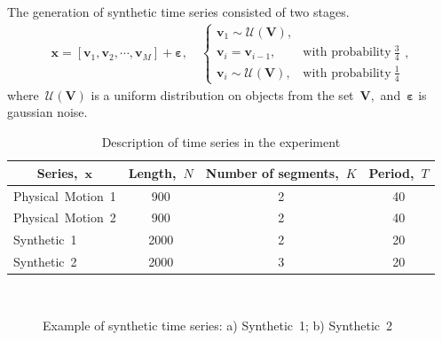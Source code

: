 \documentclass[12pt, twoside]{article}
\numberwithin{equation}{section}
\begin{document}
The generation of synthetic time series consisted of two stages.
\begin{equation}
\label{eq:exp:1}
\begin{aligned}
\textbf{x} = [\textbf{v}_{1}, \textbf{v}_{2}, \cdots, \textbf{v}_{M}] + \bm{\varepsilon}, \quad \begin{cases}
    \textbf{v}_{1} \sim \mathcal{U}\left(\mathbf{V}\right),\\
    \textbf{v}_{i} = \textbf{v}_{i - 1}, & \text{with probability}~\frac{3}{4}\\
    \textbf{v}_{i} \sim \mathcal{U}\left(\mathbf{V}\right), & \text{with probability}~\frac{1}{4}
\end{cases},
\end{aligned}
\end{equation}
where~$\mathcal{U}\left(\mathbf{V}\right)$ is a uniform distribution on objects from the set~$\mathbf{V},$ and~$\bm{\varepsilon}$ is gaussian noise.

\begin{table}[h!t]
\begin{center}
\caption{Description of time series in the experiment}
\label{table_1}
\begin{tabular}{|c|c|c|c|}
\hline
	Series,~$\textbf{x}$ &Length,~$N$& Number of segments,~$K$& Period,~$T$\\
	\hline
	\multicolumn{1}{|l|}{Physical~Motion~1}
	& 900& 2& 40\\
	\hline
	\multicolumn{1}{|l|}{Physical~Motion~2}
	& 900& 2& 40\\
	\hline
	\multicolumn{1}{|l|}{Synthetic~1}
	& 2000& 2& 20\\
	\hline
	\multicolumn{1}{|l|}{Synthetic~2}
	& 2000& 3& 20\\
\hline

\end{tabular}
\end{center}
\end{table}

\begin{figure}[h!t]\center
{}
\\
\caption{Example of synthetic time series: a) Synthetic~1; b) Synthetic~2}
\label{fig_synthetic_series}
\end{figure}
\end{document}
